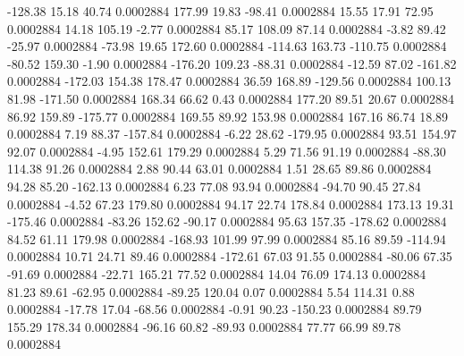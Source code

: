      -128.38       15.18       40.74     0.0002884
      177.99       19.83      -98.41     0.0002884
       15.55       17.91       72.95     0.0002884
       14.18      105.19       -2.77     0.0002884
       85.17      108.09       87.14     0.0002884
       -3.82       89.42      -25.97     0.0002884
      -73.98       19.65      172.60     0.0002884
     -114.63      163.73     -110.75     0.0002884
      -80.52      159.30       -1.90     0.0002884
     -176.20      109.23      -88.31     0.0002884
      -12.59       87.02     -161.82     0.0002884
     -172.03      154.38      178.47     0.0002884
       36.59      168.89     -129.56     0.0002884
      100.13       81.98     -171.50     0.0002884
      168.34       66.62        0.43     0.0002884
      177.20       89.51       20.67     0.0002884
       86.92      159.89     -175.77     0.0002884
      169.55       89.92      153.98     0.0002884
      167.16       86.74       18.89     0.0002884
        7.19       88.37     -157.84     0.0002884
       -6.22       28.62     -179.95     0.0002884
       93.51      154.97       92.07     0.0002884
       -4.95      152.61      179.29     0.0002884
        5.29       71.56       91.19     0.0002884
      -88.30      114.38       91.26     0.0002884
        2.88       90.44       63.01     0.0002884
        1.51       28.65       89.86     0.0002884
       94.28       85.20     -162.13     0.0002884
        6.23       77.08       93.94     0.0002884
      -94.70       90.45       27.84     0.0002884
       -4.52       67.23      179.80     0.0002884
       94.17       22.74      178.84     0.0002884
      173.13       19.31     -175.46     0.0002884
      -83.26      152.62      -90.17     0.0002884
       95.63      157.35     -178.62     0.0002884
       84.52       61.11      179.98     0.0002884
     -168.93      101.99       97.99     0.0002884
       85.16       89.59     -114.94     0.0002884
       10.71       24.71       89.46     0.0002884
     -172.61       67.03       91.55     0.0002884
      -80.06       67.35      -91.69     0.0002884
      -22.71      165.21       77.52     0.0002884
       14.04       76.09      174.13     0.0002884
       81.23       89.61      -62.95     0.0002884
      -89.25      120.04        0.07     0.0002884
        5.54      114.31        0.88     0.0002884
      -17.78       17.04      -68.56     0.0002884
       -0.91       90.23     -150.23     0.0002884
       89.79      155.29      178.34     0.0002884
      -96.16       60.82      -89.93     0.0002884
       77.77       66.99       89.78     0.0002884
